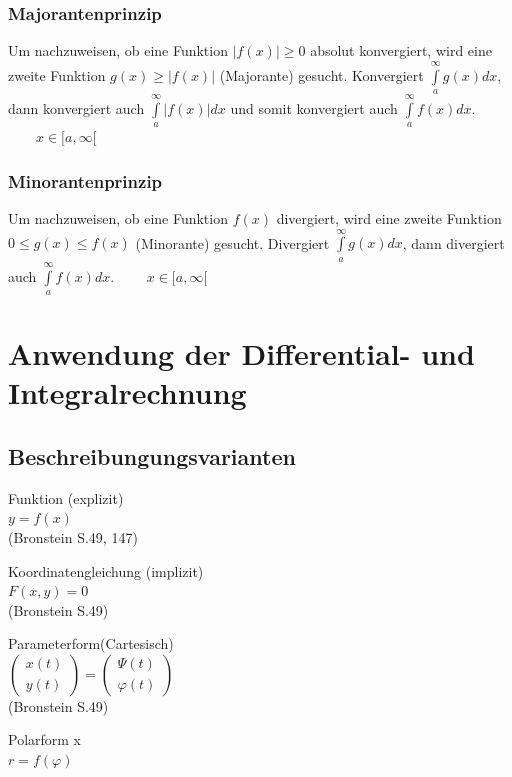\subsubsection{Majorantenprinzip}
	Um nachzuweisen, ob eine Funktion $|f(x)| \geq 0$ absolut konvergiert, wird eine zweite
	Funktion $g(x) \geq |f(x)|$ (Majorante) gesucht. Konvergiert $\int\limits_a^{\infty} g(x) dx$,
	dann konvergiert auch $\int\limits_a^{\infty} |f(x)| dx$ und somit konvergiert auch $\int\limits_a^{\infty} f(x) dx$. $\qquad x \in [a, \infty[$

\subsubsection{Minorantenprinzip}
	Um nachzuweisen, ob eine Funktion $f(x)$ divergiert, wird eine zweite
	Funktion $0 \leq g(x) \leq f(x)$ (Minorante) gesucht. Divergiert
	$\int\limits_a^{\infty} g(x) dx$,
	dann divergiert auch $\int\limits_a^{\infty} f(x) dx$. $\qquad x \in [a, \infty[$
	

\section{Anwendung der Differential- und Integralrechnung}

\subsection{Beschreibungungsvarianten}
	\begin{minipage}[t]{3.5cm}
		Funktion (explizit) \\
		$ y = f(x)$ \\
        \tiny{(Bronstein S.49, 147)}
	\end{minipage}
	\begin{minipage}[t]{6cm} 		
		Koordinatengleichung (implizit) \\
		$ F(x,y) = 0 $ \\
        \tiny{(Bronstein S.49)}
	\end{minipage}
	\begin{minipage}[t]{5.5cm} 		
		Parameterform(Cartesisch) \\
		$ \left( \begin{array} {l} x(t) \\ y(t) \end{array} \right) =
          \left( \begin{array} {l} \Psi(t) \\ \varphi(t) \end{array} \right)$\\
        \tiny{(Bronstein S.49)}
	\end{minipage} 
	\begin{minipage}[t]{3cm}
    	Polarform x\\
    	$ r=f(\varphi) $ \\
    \end{minipage}\\


